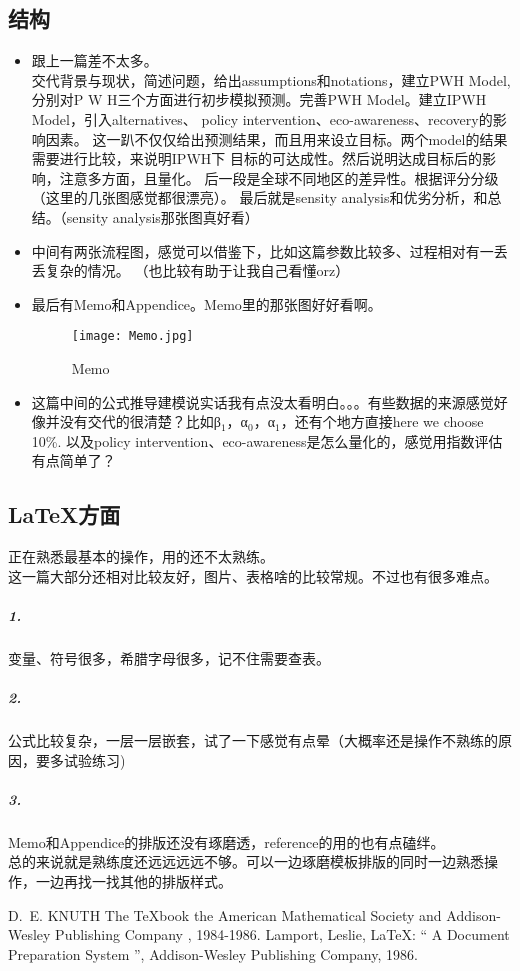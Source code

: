 \documentclass{article}
\begin{document}
\subsection{结构}
\begin{itemize}
    \item 跟上一篇差不太多。\cite{1}   \\   
    交代背景与现状，简述问题，给出assumptions和notations，建立PWH Model,
          分别对P W H三个方面进行初步模拟预测。完善PWH Model。建立IPWH Model，引入alternatives、
          policy intervention、eco-awareness、recovery的影响因素。
          这一趴不仅仅给出预测结果，而且用来设立目标。两个model的结果需要进行比较，来说明IPWH下
          目标的可达成性。然后说明达成目标后的影响，注意多方面，且量化。
          后一段是全球不同地区的差异性。根据评分分级（这里的几张图感觉都很漂亮）。
          最后就是sensity analysis和优劣分析，和总结。（sensity analysis那张图真好看）
    \item 中间有两张流程图，感觉可以借鉴下，比如这篇参数比较多、过程相对有一丢丢复杂的情况。
        （也比较有助于让我自己看懂orz）
    \item 最后有Memo和Appendice。Memo里的那张图好好看啊。\\
    \begin{figure}[htbp]
        \centering
        \texttt{[image: Memo.jpg]}
        \caption{Memo}
        \label{fig:myphoto}
    \end{figure}
    \item 这篇中间的公式推导建模说实话我有点没太看明白。。。有些数据的来源感觉好像并没有交代的很清楚？比如β$_1$，α$_0$，α$_1$，还有个地方直接here we choose 10\%.
    以及policy intervention、eco-awareness是怎么量化的，感觉用指数评估有点简单了？
\end{itemize}

\subsection{\LaTeX 方面}
正在熟悉最基本的操作，用的还不太熟练。\\
这一篇大部分还相对比较友好，图片、表格啥的比较常规。不过也有很多难点。
\subparagraph{1.}变量、符号很多，希腊字母很多，记不住需要查表。
\subparagraph{2.}公式比较复杂，一层一层嵌套，试了一下感觉有点晕（大概率还是操作不熟练的原因，要多试验练习)
\subparagraph{3.}Memo和Appendice的排版还没有琢磨透，reference的用的也有点磕绊。\\
                总的来说就是熟练度还远远远远不够。可以一边琢磨模板排版的同时一边熟悉操作，一边再找一找其他的排版样式。\\
                


\begin{thebibliography}{99}
     D.~E. KNUTH   The \TeX{}book  the American
    Mathematical Society and Addison-Wesley
    Publishing Company , 1984-1986.
    Lamport, Leslie,  \LaTeX{}: `` A Document Preparation System '',
    Addison-Wesley Publishing Company, 1986.
\end{thebibliography}
\end{document}

